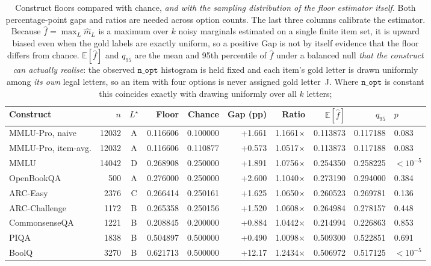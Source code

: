 \begin{table}[t]
\centering
\footnotesize
\setlength{\tabcolsep}{2.4pt}
\begin{tabular}{lrcrrrrrrl}
\toprule
Construct & $n$ & $L^\star$ & Floor & Chance & Gap (pp) & Ratio & $\mathbb{E}[\hat f]$ & $q_{95}$ & $p$ \\
\midrule
MMLU-Pro, naive & 12032 & A & 0.116606 & 0.100000 & +1.661 & 1.1661$\times$ & 0.113873 & 0.117188 & 0.083 \\
MMLU-Pro, item-avg. & 12032 & A & 0.116606 & 0.110877 & +0.573 & 1.0517$\times$ & 0.113873 & 0.117188 & 0.083 \\
MMLU & 14042 & D & 0.268908 & 0.250000 & +1.891 & 1.0756$\times$ & 0.254350 & 0.258225 & $<10^{-5}$ \\
OpenBookQA & 500 & A & 0.276000 & 0.250000 & +2.600 & 1.1040$\times$ & 0.273190 & 0.294000 & 0.384 \\
ARC-Easy & 2376 & C & 0.266414 & 0.250161 & +1.625 & 1.0650$\times$ & 0.260523 & 0.269781 & 0.136 \\
ARC-Challenge & 1172 & B & 0.265358 & 0.250156 & +1.520 & 1.0608$\times$ & 0.264984 & 0.278157 & 0.448 \\
CommonsenseQA & 1221 & B & 0.208845 & 0.200000 & +0.884 & 1.0442$\times$ & 0.214994 & 0.226863 & 0.853 \\
PIQA & 1838 & B & 0.504897 & 0.500000 & +0.490 & 1.0098$\times$ & 0.509300 & 0.522851 & 0.691 \\
BoolQ & 3270 & B & 0.621713 & 0.500000 & +12.17 & 1.2434$\times$ & 0.506972 & 0.517125 & $<10^{-5}$ \\
\bottomrule
\end{tabular}
\caption{Construct floors compared with chance, \emph{and with the sampling distribution of the
floor estimator itself}. Both percentage-point gaps and ratios are needed across option counts.
The last three columns calibrate the estimator. Because $\hat f=\max_L \hat m_L$ is a maximum over
$k$ noisy marginals estimated on a single finite item set, it is upward biased even when the gold
labels are exactly uniform, so a positive Gap is not by itself evidence that the floor differs from
chance. $\mathbb{E}[\hat f]$ and $q_{95}$ are the mean and 95th percentile of $\hat f$ under a
balanced null \emph{that the construct can actually realise}: the observed
$\texttt{n\_opt}$ histogram is held fixed and each item's gold letter is drawn uniformly among
\emph{its own} legal letters, so an item with four options is never assigned gold letter~J. Where
$\texttt{n\_opt}$ is constant this coincides exactly with drawing uniformly over all $k$ letters;
}
\end{table}
